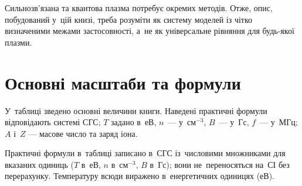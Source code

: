 Сильнозв'язана та квантова плазма потребує окремих методів. Отже,
опис, побудований у~цій книзі, треба розуміти як систему моделей із
чітко визначеними межами застосовності, а~не як універсальне рівняння
для будь-якої плазми.

\section{Основні масштаби та формули}

У~таблиці зведено основні величини книги. Наведені практичні
формули відповідають системі СГС; $T$ задано в~еВ, $n$~--- у~$\mathrm{см}^{-3}$, $B$~--- у~Гс, $f$~--- у~МГц; $A$ і~$Z$ ---
масове число та заряд іона.

\begin{Attention}
	Практичні формули в~таблиці записано в~СГС із~числовими множниками для вказаних одиниць ($T$ в~еВ, $n$ в~см$^{-3}$, $B$ в~Гс); вони не~переносяться на~СІ без перерахунку.
	Температуру всюди виражено в~енергетичних одиницях (еВ).
\end{Attention}

